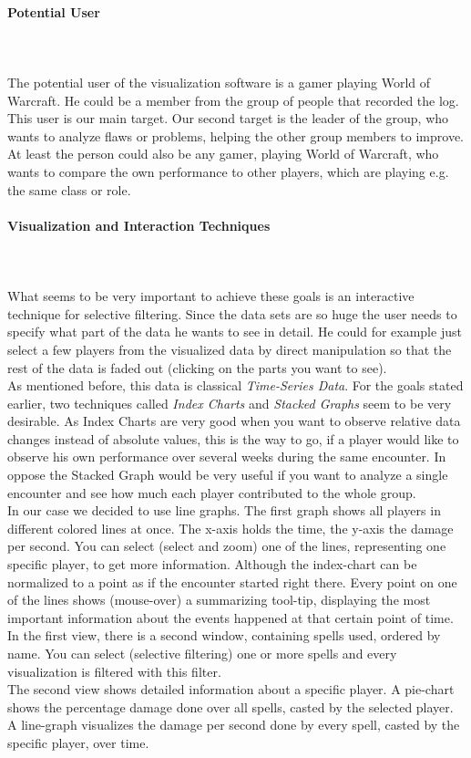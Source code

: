 \documentclass{scrartcl}
\begin{document}
\paragraph{Potential User}
\hfill \\ \hfill \\
The potential user of the visualization software is a gamer playing World of Warcraft. He could be a member from the group of people that recorded the log. This user is our main target. Our second target is the leader of the group, who wants to analyze flaws or problems, helping the other group members to improve. At least the person could also be any gamer, playing World of Warcraft, who wants to compare the own performance to other players, which are playing e.g. the same class or role. 

\paragraph{Visualization and Interaction Techniques}
\hfill \\ \hfill \\
What seems to be very important to achieve these goals is an interactive technique for selective filtering. Since the data sets are so huge the user needs to specify what part of the data he wants to see in detail. He could for example just select a few players from the visualized data by direct manipulation so that the rest of the data is faded out (clicking on the parts you want to see).\\
As mentioned before, this data is classical \emph{Time-Series Data}. For the goals stated earlier, two techniques called \emph{Index Charts} and \emph{Stacked Graphs} seem to be very desirable. As Index Charts are very good when you want to observe relative data changes instead of absolute values, this is the way to go, if a player would like to observe his own performance over several weeks during the same encounter. In oppose the Stacked Graph would be very useful if you want to analyze a single encounter and see how much each player contributed to the whole group.\\
In our case we decided to use line graphs. The first graph shows all players in different colored lines at once. The x-axis holds the time, the y-axis the damage per second. You can select (select and zoom) one of the lines, representing one specific player, to get more information. Although the index-chart can be normalized to a point as if the encounter started right there. Every point on one of the lines shows (mouse-over) a summarizing tool-tip, displaying the most important information about the events happened at that certain point of time.\\
In the first view, there is a second window, containing spells used, ordered by name. You can select (selective filtering)  one or more spells and every visualization is filtered with this filter.\\
The second view shows detailed information about a specific player. A pie-chart shows the percentage damage done over all spells, casted by the selected player. A line-graph visualizes the damage per second done by every spell, casted by the specific player, over time.
\end{document}
